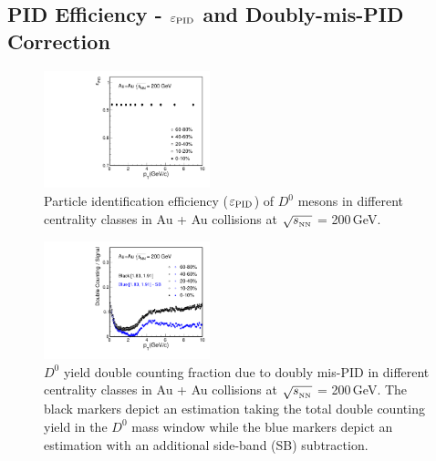 \documentclass[%
 reprint,	
 amsmath,amssymb,
 aps,
 prc,
]{revtex4-1}
\begin{document}
\subsection{\label{sec:correction:PID}PID Efficiency - $\varepsilon_{\rm PID}$ and Doubly-mis-PID Correction}

\begin{figure}
\centering
\includegraphics[width=0.43\textwidth]{fig/Datad0Eff_pid_10.pdf}
\caption{Particle identification efficiency ($\varepsilon_{\rm PID}$) of $D^0$ mesons in different centrality classes in Au + Au collisions at $\sqrt{s_{_{\rm NN}}}$ = 200\,GeV.}
\label{fig:Datad0Eff_pid} 
\end{figure}

\begin{figure}
\centering
\includegraphics[width=0.43\textwidth]{fig/Double_counting.pdf}
\caption{$D^{0}$ yield double counting fraction due to doubly mis-PID in different centrality classes in Au + Au collisions at $\sqrt{s_{_{\rm NN}}}$ = 200\,GeV. The black markers depict an estimation taking the total double counting yield in the $D^0$ mass window while the blue markers depict an estimation with an additional side-band (SB) subtraction.}
\label{fig:Datad0Eff_doublecounting} 
\end{figure}
\end{document}
